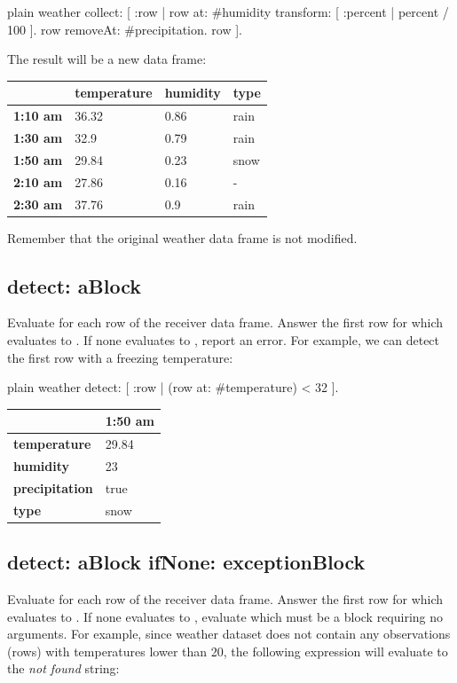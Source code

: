 \documentclass[10pt,twoside,english]{_support/latex/sbabook/sbabook}
\begin{document}
\begin{displaycode}{plain}
weather collect: [ :row |
  row at: #humidity transform: [ :percent | percent / 100 ].
  row removeAt: #precipitation.
  row ].
\end{displaycode}

The result will be a new data frame:

\begin{tabular}{llll}
\toprule
 & \textbf{temperature} & \textbf{humidity} & \textbf{type} \\
\midrule
\textbf{1:10 am} & 36.32 & 0.86 & rain \\
\textbf{1:30 am} & 32.9 & 0.79 & rain \\
\textbf{1:50 am} & 29.84 & 0.23 & snow \\
\textbf{2:10 am} & 27.86 & 0.16 & - \\
\textbf{2:30 am} & 37.76 & 0.9 & rain \\
\bottomrule
\end{tabular}

Remember that the original weather data frame is not modified.
\subsection{detect: aBlock}
Evaluate  for each row of the receiver data frame. Answer the first row for which  evaluates to . If none evaluates to , report an error. For example, we can detect the first row with a freezing temperature:

\begin{displaycode}{plain}
weather detect: [ :row |
  (row at: #temperature) < 32 ].
\end{displaycode}

\begin{tabular}{ll}
\toprule
 & \textbf{1:50 am} \\
\midrule
\textbf{temperature} & 29.84 \\
\textbf{humidity} & 23 \\
\textbf{precipitation} & true \\
\textbf{type} & snow \\
\bottomrule
\end{tabular}
\subsection{detect: aBlock ifNone: exceptionBlock}
Evaluate  for each row of the receiver data frame. Answer the first row for which  evaluates to . If none evaluates to , evaluate  which must be a block requiring no arguments. For example, since weather dataset does not contain any observations (rows) with temperatures lower than 20, the following expression will evaluate to the \textit{not found} string:
\end{document}
